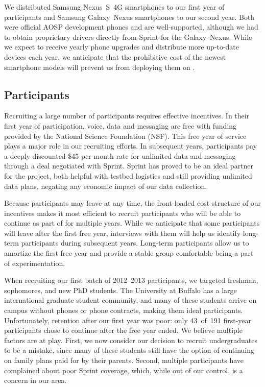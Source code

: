 We distributed Samsung Nexus~S~4G smartphones to our first year of
participants and Samsung Galaxy~Nexus smartphones to our second year. Both
were official AOSP development phones and are well-supported, although we had
to obtain proprietary drivers directly from Sprint for the Galaxy~Nexus.
While we expect to receive yearly phone upgrades and distribute more
up-to-date devices each year, we anticipate that the prohibitive cost of the
newest smartphone models will prevent us from deploying them on \PhoneLab{}.



\subsection{Participants}

Recruiting a large number of \PhoneLab{} participants requires effective
incentives. In their first year of \PhoneLab{} participation, voice, data and
messaging are free with funding provided by the National Science Foundation
(NSF). This free year of service plays a major role in our recruiting
efforts. In subsequent years, participants pay a deeply discounted \$45 per
month rate for unlimited data and messaging through a deal negotiated with
Sprint. Sprint has proved to be an ideal partner for the \PhoneLab{} project,
both helpful with testbed logistics and still providing unlimited data plans,
negating any economic impact of our data collection.

Because participants may leave at any time, the front-loaded cost structure
of our incentives makes it most efficient to recruit participants who will be
able to continue as part of \PhoneLab{} for multiple years. While we
anticipate that some participants will leave after the first free year,
interviews with them will help us identify long-term participants during
subsequent years. Long-term participants allow us to amortize the first free
year and provide a stable group comfortable being a part of \PhoneLab{}
experimentation.

When recruiting our first batch of 2012--2013 participants, we targeted
freshman, sophomores, and new PhD students. The University at Buffalo has a
large international graduate student community, and many of these students
arrive on campus without phones or phone contracts, making them ideal
\PhoneLab{} participants. Unfortunately, retention after our first year was
poor: only 43~of~191 first-year participants chose to continue after the free
year ended. We believe multiple factors are at play. First, we now consider
our decision to recruit undergraduates to be a mistake, since many of these
students still have the option of continuing on family plans paid for by
their parents. Second, multiple participants have complained about poor
Sprint coverage, which, while out of our control, is a concern in our area.

